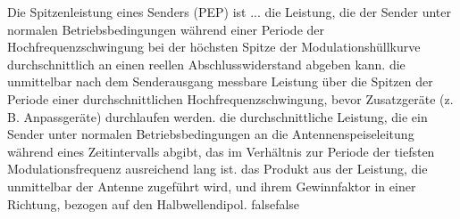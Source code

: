     {Die Spitzenleistung eines Senders (PEP) ist ...}
    {die Leistung, die der Sender unter normalen Betriebsbedingungen während einer Periode der Hochfrequenzschwingung bei der höchsten Spitze der Modulationshüllkurve durchschnittlich an einen reellen Abschlusswiderstand abgeben kann.}
    {die unmittelbar nach dem Senderausgang messbare Leistung über die Spitzen der Periode einer durchschnittlichen Hochfrequenzschwingung, bevor Zusatzgeräte (z. B. Anpassgeräte) durchlaufen werden.}
    {die durchschnittliche Leistung, die ein Sender unter normalen Betriebsbedingungen an die Antennenspeiseleitung während eines Zeitintervalls abgibt, das im Verhältnis zur Periode der tiefsten Modulationsfrequenz ausreichend lang ist.}
    {das Produkt aus der Leistung, die unmittelbar der Antenne zugeführt wird, und ihrem Gewinnfaktor in einer Richtung, bezogen auf den Halbwellendipol.}
    {false}{false}